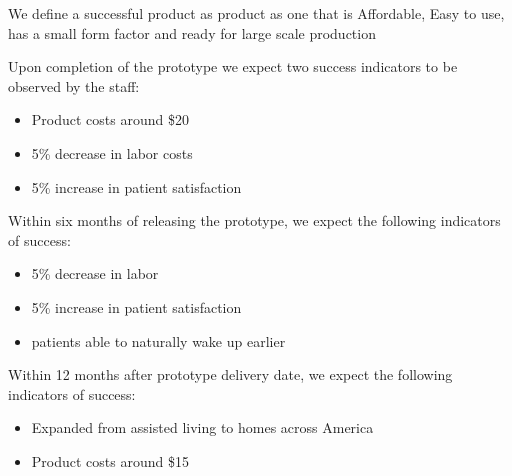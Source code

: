 We define a successful product as product as one that is Affordable, Easy to use, has a small form factor and ready for large scale production

\begin{center}
    Upon completion of the prototype we expect two success indicators to be observed by the staff:
\end{center}
\begin{itemize}
  \item Product costs around \$20
  \item 5\% decrease in labor costs 
  \item 5\% increase in patient satisfaction
\end{itemize}

Within six months of releasing the prototype, we expect the following indicators of success:
\begin{itemize}
  \item 5\% decrease in labor
  \item 5\% increase in patient satisfaction
  \item patients able to naturally wake up earlier
\end{itemize}

Within 12 months after prototype delivery date, we expect the following indicators of success:
\begin{itemize}
    \item Expanded from assisted living to homes across America
    \item Product costs around \$15
\end{itemize}
\\
\\

